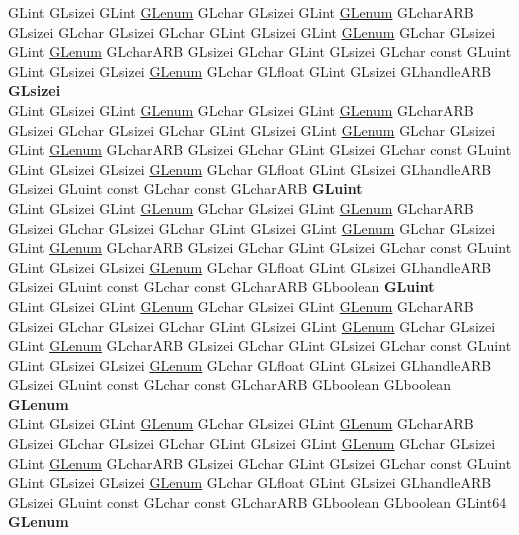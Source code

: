 \begin{DoxyCompactItemize}
\begin{tabbing}
\>GLint GLsizei GLint \hyperlink{interfacevoid}{GLenum} GLchar GLsizei GLint \hyperlink{interfacevoid}{GLenum} GLcharARB GLsizei GLchar GLsizei GLchar GLint GLsizei GLint \hyperlink{interfacevoid}{GLenum} GLchar GLsizei GLint \hyperlink{interfacevoid}{GLenum} GLcharARB GLsizei GLchar GLint GLsizei GLchar const GLuint GLint GLsizei GLsizei \hyperlink{interfacevoid}{GLenum} GLchar GLfloat GLint GLsizei GLhandleARB {\bfseries GLsizei}\\
\>GLint GLsizei GLint \hyperlink{interfacevoid}{GLenum} GLchar GLsizei GLint \hyperlink{interfacevoid}{GLenum} GLcharARB GLsizei GLchar GLsizei GLchar GLint GLsizei GLint \hyperlink{interfacevoid}{GLenum} GLchar GLsizei GLint \hyperlink{interfacevoid}{GLenum} GLcharARB GLsizei GLchar GLint GLsizei GLchar const GLuint GLint GLsizei GLsizei \hyperlink{interfacevoid}{GLenum} GLchar GLfloat GLint GLsizei GLhandleARB GLsizei GLuint const GLchar const GLcharARB {\bfseries GLuint}\\
\>GLint GLsizei GLint \hyperlink{interfacevoid}{GLenum} GLchar GLsizei GLint \hyperlink{interfacevoid}{GLenum} GLcharARB GLsizei GLchar GLsizei GLchar GLint GLsizei GLint \hyperlink{interfacevoid}{GLenum} GLchar GLsizei GLint \hyperlink{interfacevoid}{GLenum} GLcharARB GLsizei GLchar GLint GLsizei GLchar const GLuint GLint GLsizei GLsizei \hyperlink{interfacevoid}{GLenum} GLchar GLfloat GLint GLsizei GLhandleARB GLsizei GLuint const GLchar const GLcharARB GLboolean {\bfseries GLuint}\\
\>GLint GLsizei GLint \hyperlink{interfacevoid}{GLenum} GLchar GLsizei GLint \hyperlink{interfacevoid}{GLenum} GLcharARB GLsizei GLchar GLsizei GLchar GLint GLsizei GLint \hyperlink{interfacevoid}{GLenum} GLchar GLsizei GLint \hyperlink{interfacevoid}{GLenum} GLcharARB GLsizei GLchar GLint GLsizei GLchar const GLuint GLint GLsizei GLsizei \hyperlink{interfacevoid}{GLenum} GLchar GLfloat GLint GLsizei GLhandleARB GLsizei GLuint const GLchar const GLcharARB GLboolean GLboolean {\bfseries GLenum}\\
\>GLint GLsizei GLint \hyperlink{interfacevoid}{GLenum} GLchar GLsizei GLint \hyperlink{interfacevoid}{GLenum} GLcharARB GLsizei GLchar GLsizei GLchar GLint GLsizei GLint \hyperlink{interfacevoid}{GLenum} GLchar GLsizei GLint \hyperlink{interfacevoid}{GLenum} GLcharARB GLsizei GLchar GLint GLsizei GLchar const GLuint GLint GLsizei GLsizei \hyperlink{interfacevoid}{GLenum} GLchar GLfloat GLint GLsizei GLhandleARB GLsizei GLuint const GLchar const GLcharARB GLboolean GLboolean GLint64 {\bfseries GLenum}\\

\end{tabbing}
\end{DoxyCompactItemize}
